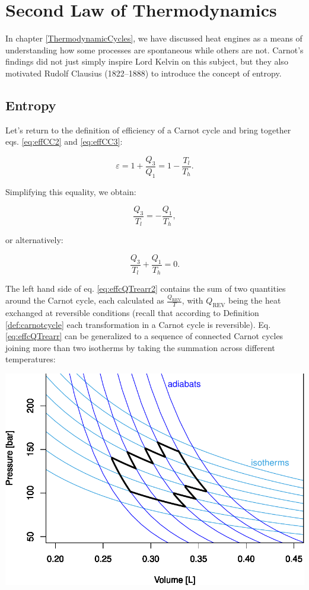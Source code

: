 \documentclass[
  9pt,
]{extbook}
\theoremstyle{definition}
\theoremstyle{definition}
\theoremstyle{definition}
\theoremstyle{remark}
\begin{document}
\hypertarget{SecondLaw}{%
\chapter{Second Law of Thermodynamics}\label{SecondLaw}}

In chapter \ref{ThermodynamicCycles}, we have discussed heat engines as a means of understanding how some processes are spontaneous while others are not. Carnot's findings did not just simply inspire Lord Kelvin on this subject, but they also motivated Rudolf Clausius (1822--1888) to introduce the concept of entropy.

\hypertarget{entropyint}{%
\section{Entropy}\label{entropyint}}

Let's return to the definition of efficiency of a Carnot cycle and bring together eqs. \eqref{eq:effCC2} and \eqref{eq:effCC3}:

\begin{equation}
\varepsilon = 1+\frac{Q_3}{Q_1} = 1-\frac{T_l}{T_h}.
\label{eq:effcQT}
\end{equation}

Simplifying this equality, we obtain:

\begin{equation}
\frac{Q_3}{T_l} = -\frac{Q_1}{T_h},
\label{eq:effcQTrearr}
\end{equation}

or alternatively:

\begin{equation}
\frac{Q_3}{T_l} + \frac{Q_1}{T_h} = 0.
\label{eq:effcQTrearr2}
\end{equation}

The left hand side of eq. \eqref{eq:effcQTrearr2} contains the sum of two quantities around the Carnot cycle, each calculated as \(\frac{Q_{\mathrm{REV}}}{T}\), with \(Q_{\mathrm{REV}}\) being the heat exchanged at reversible conditions (recall that according to Definition \ref{def:carnotcycle} each transformation in a Carnot cycle is reversible). Eq. \eqref{eq:effcQTrearr} can be generalized to a sequence of connected Carnot cycles joining more than two isotherms by taking the summation across different temperatures:

\begin{center}\includegraphics[width=0.7\linewidth]{pchem1_files/figure-latex/unnamed-chunk-12-1} \end{center}
\end{document}
